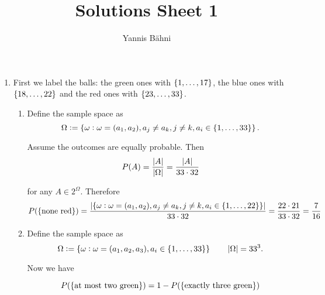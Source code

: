 

\title{Solutions Sheet 1}
\author{Yannis B\"{a}hni}
\address[Yannis B\"{a}hni]{University of Zurich, R\"{a}mistrasse 71, 8006 Zurich}


\maketitle
\thispagestyle{fancy}
\begin{enumerate}[label = \textbf{Exercise \arabic*.},wide = 0pt, itemsep=1.5ex]
\item
	First we label the balls: the green ones with $\cbr[0]{1,\dots,17}$, the blue ones with $\cbr[0]{18,\dots,22}$ and the red ones with $\cbr[0]{23,\dots,33}$.
	\begin{enumerate}[label = \arabic*.,wide = 0pt, itemsep=1.5ex]
		\item Define the sample space as
			\begin{equation*}
				\Omega := \cbr[0]{\omega : \omega = (a_1,a_2), a_j \neq a_k, j\neq k, a_i \in \cbr[0]{1,\dots,33}}.
			\end{equation*}

			Assume the outcomes are equally probable. Then 
			\begin{equation*}
				P(A) = \frac{\abs[0]{A}}{\abs[0]{\Omega}} = \frac{\abs[0]{A}}{33 \cdot 32}
			\end{equation*}

			\noindent for any $A \in 2^\Omega$. Therefore
			\begin{equation*}
				P(\cbr[0]{\text{none red}}) = \frac{\abs[0]{\cbr[0]{\omega : \omega = (a_1,a_2), a_j \neq a_k, j\neq k, a_i \in \cbr[0]{1,\dots,22}}}}{33 \cdot 32}= \frac{22 \cdot 21}{33 \cdot 32}= \frac{7}{16}
			\end{equation*}

		\item Define the sample space as 
			\begin{equation*}
				\Omega := \cbr[0]{\omega : \omega = (a_1,a_2,a_3), a_i \in \cbr[0]{1,\dots,33}} \qquad \abs[0]{\Omega} = 33^3.
			\end{equation*}

			Now we have 
			
			\begin{equation*}
				P(\cbr[0]{\text{at most two green}}) = 1 - P(\cbr[0]{\text{exactly three green}})
			\end{equation*}


\end{enumerate}
\end{enumerate}
